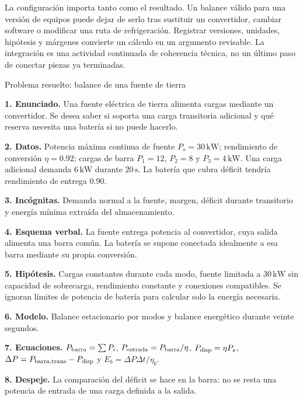 La configuración importa tanto como el resultado. Un balance válido para una versión de equipos puede dejar de serlo tras sustituir un convertidor, cambiar software o modificar una ruta de refrigeración. Registrar versiones, unidades, hipótesis y márgenes convierte un cálculo en un argumento revisable. La integración es una actividad continuada de coherencia técnica, no un último paso de conectar piezas ya terminadas.

\begin{studiumworked}{Problema resuelto: balance de una fuente de tierra}

\textbf{1. Enunciado.} Una fuente eléctrica de tierra alimenta cargas mediante un convertidor. Se desea saber si soporta una carga transitoria adicional y qué reserva necesita una batería si no puede hacerlo.

\textbf{2. Datos.} Potencia máxima continua de fuente $P_s=30\,\mathrm{kW}$; rendimiento de conversión $\eta=0.92$; cargas de barra $P_1=12$, $P_2=8$ y $P_3=4\,\mathrm{kW}$. Una carga adicional demanda $6\,\mathrm{kW}$ durante $20\,\mathrm{s}$. La batería que cubra déficit tendría rendimiento de entrega $0.90$.

\textbf{3. Incógnitas.} Demanda normal a la fuente, margen, déficit durante transitorio y energía mínima extraída del almacenamiento.

\textbf{4. Esquema verbal.} La fuente entrega potencia al convertidor, cuya salida alimenta una barra común. La batería se supone conectada idealmente a esa barra mediante su propia conversión.

\textbf{5. Hipótesis.} Cargas constantes durante cada modo, fuente limitada a $30\,\mathrm{kW}$ sin capacidad de sobrecarga, rendimiento constante y conexiones compatibles. Se ignoran límites de potencia de batería para calcular solo la energía necesaria.

\textbf{6. Modelo.} Balance estacionario por modos y balance energético durante veinte segundos.

\textbf{7. Ecuaciones.} $P_{\rm barra}=\sum P_i$, $P_{\rm entrada}=P_{\rm barra}/\eta$, $P_{\rm disp}=\eta P_s$, $\Delta P=P_{\rm barra,trans}-P_{\rm disp}$ y $E_b=\Delta P\Delta t/\eta_b$.

\textbf{8. Despeje.} La comparación del déficit se hace en la barra: no se resta una potencia de entrada de una carga definida a la salida.


\end{studiumworked}

